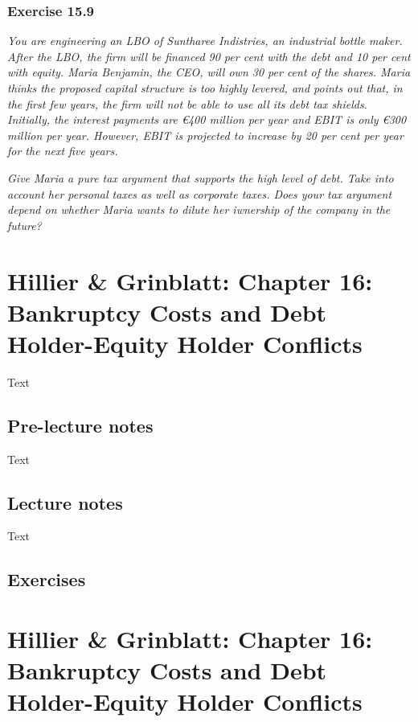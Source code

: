 \documentclass[]{book}
\newcommand{\euro}{€}
\theoremstyle{definition}
\theoremstyle{definition}
\theoremstyle{remark}
\begin{document}
\subsection{Exercise 15.9}\label{exercise-15.9}

\emph{You are engineering an LBO of Suntharee Indistries, an industrial
bottle maker. After the LBO, the firm will be financed 90 per cent with
the debt and 10 per cent with equity. Maria Benjamin, the CEO, will own
30 per cent of the shares. Maria thinks the proposed capital structure
is too highly levered, and points out that, in the first few years, the
firm will not be able to use all its debt tax shields. Initially, the
interest payments are \euro{}400 million per year and EBIT is only
\euro{}300 million per year. However, EBIT is projected to increase by
20 per cent per year for the next five years.} \citep[p.519]{book}

\emph{Give Maria a pure tax argument that supports the high level of
debt. Take into account her personal taxes as well as corporate taxes.
Does your tax argument depend on whether Maria wants to dilute her
iwnership of the company in the future?} \citep[p.519]{book}

\chapter{Hillier \& Grinblatt: Chapter 16: Bankruptcy Costs and Debt
Holder-Equity Holder
Conflicts}\label{hillier-grinblatt-chapter-16-bankruptcy-costs-and-debt-holder-equity-holder-conflicts}

Text

\section{Pre-lecture notes}\label{pre-lecture-notes-15}

Text

\section{Lecture notes}\label{lecture-notes-15}

Text

\section{Exercises}\label{exercises-15}

\chapter{Hillier \& Grinblatt: Chapter 16: Bankruptcy Costs and Debt
Holder-Equity Holder
Conflicts}\label{hillier-grinblatt-chapter-16-bankruptcy-costs-and-debt-holder-equity-holder-conflicts-1}
\end{document}

